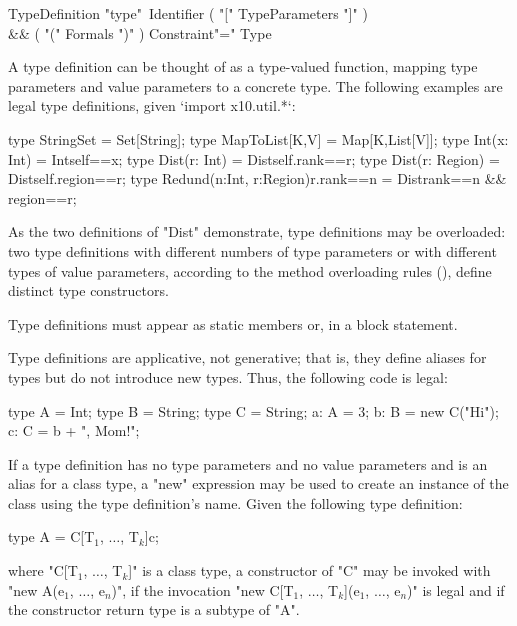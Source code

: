 \begin{grammar}
TypeDefinition \: 
                \xcd"type"~Identifier
                           ( \xcd"[" TypeParameters \xcd"]" )\opt \\
                        && ( \xcd"(" Formals \xcd")" )\opt
                            Constraint\opt \xcd"=" Type \\
\end{grammar}

\noindent
A type definition can be thought of as a type-valued function,
mapping type parameters and value parameters to a concrete type.
%
The following examples are legal type definitions, given \xcd`import x10.util.*`:
\begin{xten}
type StringSet = Set[String];
type MapToList[K,V] = Map[K,List[V]];
type Int(x: Int) = Int{self==x};
type Dist(r: Int) = Dist{self.rank==r};
type Dist(r: Region) = Dist{self.region==r};
type Redund(n:Int, r:Region){r.rank==n} = Dist{rank==n && region==r};
\end{xten}
\label{TypeDefGuard}
As the two definitions of \xcd"Dist" demonstrate, type definitions may 
be overloaded: two type definitions with different numbers of type
parameters or with different types of value
parameters, according to the method overloading rules
(), define distinct type constructors.

Type definitions must appear as static members or, 
in a block statement.

Type definitions are applicative, not generative; that is, they
define aliases for types but do not introduce new types.
Thus, the following code is legal:
\begin{xten}
type A = Int;
type B = String;
type C = String;
a: A = 3;
b: B = new C("Hi");
c: C = b + ", Mom!";
\end{xten}
If a type definition has no type parameters and no value
parameters and is an alias for a class type, a \xcd"new"
expression may be used to create an instance of the class using
the type definition's name.
Given the following type definition:
\begin{xtenmath}
type A = C[T$_1$, $\dots$, T$_k$]{c};
\end{xtenmath}
where 
\xcdmath"C[T$_1$, $\dots$, T$_k$]" is a
class type, a constructor of \xcdmath"C" may be invoked with
\xcdmath"new A(e$_1$, $\dots$, e$_n$)", if the
invocation
\xcdmath"new C[T$_1$, $\dots$, T$_k$](e$_1$, $\dots$, e$_n$)" is
legal and if the constructor return type is a subtype of
\xcd"A".

